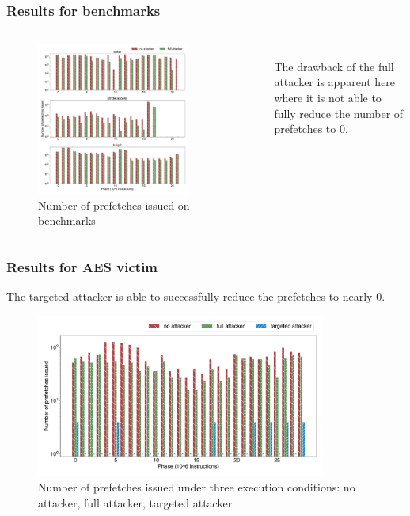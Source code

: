 \documentclass[10pt,usenames,dvipsnames]{beamer}
\begin{document}
\begin{frame}
\frametitle{Results for benchmarks}
\begin{columns}[t]
        \begin{figure}[ht]
            \centering
            \includegraphics[width=0.8\textwidth]{hwpf_num}
            \caption{Number of prefetches issued on benchmarks}
        \end{figure}
    \\
    The drawback of the full attacker is apparent here where it is not able to fully reduce
    the number of prefetches to 0.
\end{columns}
\end{frame}

\begin{frame}
\frametitle{Results for AES victim}
The targeted attacker is able to successfully reduce the prefetches to nearly 0.
\begin{figure}[ht]
    \centering
    \includegraphics[width=0.85\textwidth]{pf_issued}
    \caption{Number of prefetches issued under three execution conditions: no attacker, full attacker, targeted attacker}
\end{figure}
\end{frame}
\end{document}
